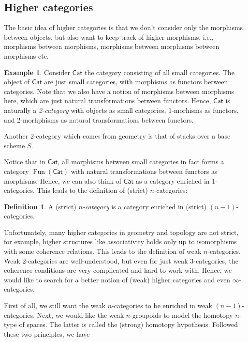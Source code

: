 \documentclass[12pt]{amsart}
\theoremstyle{definition}
\newtheorem{example}[thm]{Example}
\newtheorem{defn}[thm]{Definition}
\theoremstyle{remark}
\numberwithin{equation}{section}
\newcommand{\1}{{\mathbb{1}}}
\newcommand{\cat}{\mathsf{Cat}}
\newcommand{\fun}{\operatorname{Fun}}
\begin{document}
\subsection{Higher categories}
The basic idea of higher categories is that we don't consider only the morphisms between objects, but also want to keep track of higher morphisms, i.e., morphisms between morphisms, morphisms between morphisms between morphisms etc. 

\begin{example}
	Consider $\cat$ the category consisting of all small categories. The object of $\cat$ are just small categories, with morphisms as functors between categories. Note that we also have a notion of morphisms between morphisms here, which are just natural transformations between functors. Hence, $\cat$ is naturally a {\it 2-category} with objects as small categories, 1-morhisms as functors, and 2-morhphisms as natural transformations between functors. 
\end{example}

Another 2-category which comes from geometry is that of stacks over a base scheme $S$.

Notice that in $\cat$, all morphisms between small categories in fact forms a category $\fun(\cat)$ with natural transformations between functors as morphisms. Hence, we can also think of $\cat$ as a category enriched in 1-categories. This leads to the definition of (strict) $n$-categories:

\begin{defn}
	A (strict) {\it $n$-category} is a category enriched in (strict) $(n-1)$-categories.
\end{defn}

Unfortunately, many higher categories in geometry and topology are not strict, for example, higher structures like associativity holds only up to isomorphisms with some coherence relations. This leads to the definition of weak $n$-categories. Weak 2-categories are well-understood, but even for just weak 3-categories, the coherence conditions are very complicated and hard to work with. Hence, we would like to search for a better notion of (weak) higher categories and even $\infty$-categories.

First of all, we still want the weak $n$-categories to be enriched in weak $(n-1)$-categories. Next, we would like the weak $n$-groupoids to model the homotopy $n$-type of spaces. The latter is called the (strong) homotopy hypothesis. Followed these two principles, we have
\end{document}
